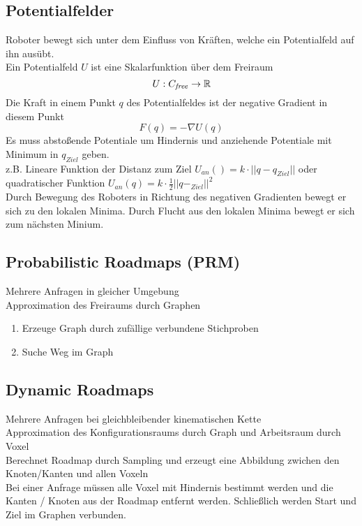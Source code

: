 \subsection{Potentialfelder}
Roboter bewegt sich unter dem Einfluss von Kräften, welche ein Potentialfeld auf ihn ausübt.\\
Ein Potentialfeld \(U\) ist eine Skalarfunktion über dem Freiraum \[U: C_{\mathit{free}} \rightarrow \mathbb{R}\]
Die Kraft in einem Punkt \(q\) des Potentialfeldes ist der negative Gradient in diesem Punkt
\[F(q) = - \nabla U(q)\]
Es muss abstoßende Potentiale um Hindernis und anziehende Potentiale mit Minimum in \(q_{\mathit{Ziel}}\) geben.\\
z.B. Lineare Funktion der Distanz zum Ziel \( U_{\mathit{an}}() = k \cdot || q - q_{\mathit{Ziel}} ||\)
oder quadratischer Funktion \(U_{\mathit{an}}(q) = k \cdot \frac{1}{2} {|| q - _{\mathit{Ziel}}||}^2\)\\
Durch Bewegung des Roboters in Richtung des negativen Gradienten bewegt er sich zu den lokalen Minima.
Durch Flucht aus den lokalen Minima bewegt er sich zum nächsten Minium.


\subsection{Probabilistic Roadmaps (PRM)}
Mehrere Anfragen in gleicher Umgebung\\
Approximation des Freiraums durch Graphen\\
\begin{enumerate}
\item Erzeuge Graph durch zufällige verbundene Stichproben
\item Suche Weg im Graph
\end{enumerate}

\subsection{Dynamic Roadmaps}
Mehrere Anfragen bei gleichbleibender kinematischen Kette\\
Approximation des Konfigurationsraums durch Graph und Arbeitsraum durch Voxel\\

Berechnet Roadmap durch Sampling und erzeugt eine Abbildung zwichen den Knoten/Kanten und allen Voxeln\\
Bei einer Anfrage müssen alle Voxel mit Hindernis bestimmt werden und die Kanten / Knoten aus der Roadmap entfernt werden.
Schließlich werden Start und Ziel im Graphen verbunden.\\


